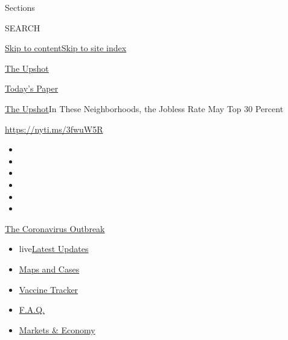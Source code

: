 Sections

SEARCH

\protect\hyperlink{site-content}{Skip to
content}\protect\hyperlink{site-index}{Skip to site index}

\href{https://www.nytimes.com/section/upshot}{The Upshot}

\href{https://myaccount.nytimes.com/auth/login?response_type=cookie\&client_id=vi}{}

\href{https://www.nytimes.com/section/todayspaper}{Today's Paper}

\href{/section/upshot}{The Upshot}\textbar{}In These Neighborhoods, the
Jobless Rate May Top 30 Percent

\href{https://nyti.ms/3fwuW5R}{https://nyti.ms/3fwuW5R}

\begin{itemize}
\item
\item
\item
\item
\item
\item
\end{itemize}

\href{https://www.nytimes.com/news-event/coronavirus?action=click\&pgtype=Article\&state=default\&region=TOP_BANNER\&context=storylines_menu}{The
Coronavirus Outbreak}

\begin{itemize}
\tightlist
\item
  live\href{https://www.nytimes.com/2020/08/08/world/coronavirus-updates.html?action=click\&pgtype=Article\&state=default\&region=TOP_BANNER\&context=storylines_menu}{Latest
  Updates}
\item
  \href{https://www.nytimes.com/interactive/2020/us/coronavirus-us-cases.html?action=click\&pgtype=Article\&state=default\&region=TOP_BANNER\&context=storylines_menu}{Maps
  and Cases}
\item
  \href{https://www.nytimes.com/interactive/2020/science/coronavirus-vaccine-tracker.html?action=click\&pgtype=Article\&state=default\&region=TOP_BANNER\&context=storylines_menu}{Vaccine
  Tracker}
\item
  \href{https://www.nytimes.com/interactive/2020/world/coronavirus-tips-advice.html?action=click\&pgtype=Article\&state=default\&region=TOP_BANNER\&context=storylines_menu}{F.A.Q.}
\item
  \href{https://www.nytimes.com/live/2020/08/07/business/stock-market-today-coronavirus?action=click\&pgtype=Article\&state=default\&region=TOP_BANNER\&context=storylines_menu}{Markets
  \& Economy}
\end{itemize}

